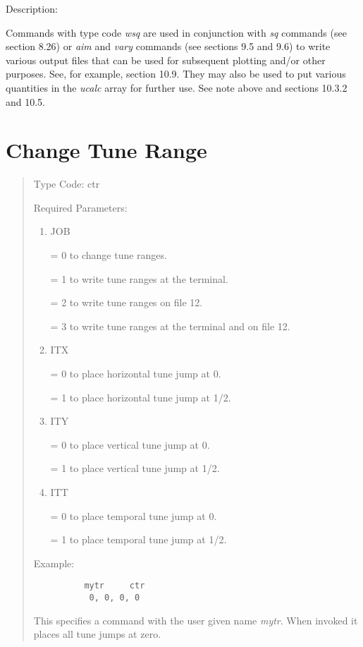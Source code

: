 \vspace{5mm}
     Description:
\vspace{2mm}

Commands with type code {\em wsq} are used in conjunction with {\em sq} commands (see section 8.26) or {\em aim} and {\em vary} commands (see sections 9.5 and 9.6) to write various output files that can be used for subsequent plotting and/or other purposes.  See, for example, section 10.9.  They may also be used to put various quantities in the {\em ucalc} array for further use.  See note above and sections 10.3.2 and 10.5.  

\newpage
\section{Change Tune Range}   
\begin{quotation}
\noindent Type Code:  ctr
\vspace{5mm}

\noindent Required Parameters:
\begin{enumerate}
       \item  JOB

              = 0 to change tune ranges.

              = 1 to write tune ranges at the terminal.

              = 2 to write tune ranges on file 12.

              = 3 to write tune ranges at the terminal and on file 12.

       \item  ITX

              = 0 to place horizontal tune jump at 0.

              = 1 to place horizontal tune jump at 1/2.

       \item  ITY

              = 0 to place vertical tune jump at 0.

              = 1 to place vertical tune jump at 1/2.

       \item  ITT

              = 0 to place temporal tune jump at 0.

              = 1 to place temporal tune jump at 1/2.
\end{enumerate}

\vspace{5mm}
\noindent Example:
\begin{verbatim}
          mytr     ctr
           0, 0, 0, 0
\end{verbatim}
This specifies a command with the user given name {\em mytr}.  When invoked it places all tune jumps at zero.
\end{quotation}

